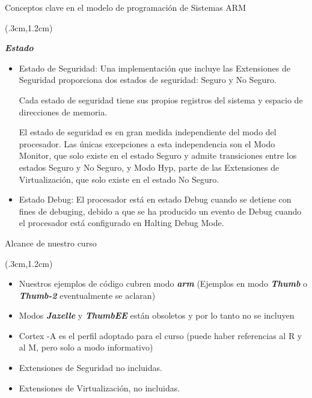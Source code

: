 \documentclass[usenames,table,dvipsnames,aspectratio=169]{beamer}
\newcommand{\arm}{\textbf{\textit{arm}}}
\newcommand{\Thumb}{\textbf{\textit{Thumb}}}
\newcommand{\Thdos}{\textbf{\textit{Thumb-2}}}
\newcommand{\jazz}{\textbf{\textit{Jazelle}}}
\newcommand{\tbee}{\textbf{\textit{ThumbEE}}}
\begin{document}
\begin{frame}{Conceptos clave en el modelo de programación de Sistemas ARM}
 \begin{textblock*}{\textwidth}(.3cm,1.2cm)
  \begin{tcolorbox}[enhanced,colframe=blue!70!black, colback=blue!4, drop fuzzy shadow=black!40, boxrule=0.8pt, boxsep=2mm, left=2mm, right=2mm, top=1mm, bottom=1mm, arc=2mm]
   \textbf{\textit{Estado}}
   \begin{itemize}
    \item Estado de Seguridad: Una implementación que incluye las Extensiones de Seguridad proporciona dos estados de seguridad: Seguro y No Seguro.

    Cada estado de seguridad tiene sus propios registros del sistema y espacio de direcciones de memoria.

    El estado de seguridad es en gran medida independiente del modo del procesador. Las únicas excepciones a esta independencia son el Modo Monitor, que solo existe en el estado Seguro y admite transiciones entre los estados Seguro y No Seguro, y Modo Hyp, parte de las Extensiones de Virtualización, que solo existe en el estado No Seguro.
    \item Estado Debug: El procesador está en estado Debug cuando se detiene con fines de debuging, debido a que se ha producido un evento de Debug cuando el procesador está configurado en Halting Debug Mode.
   \end{itemize}
  \end{tcolorbox}
  \end{textblock*}
\end{frame}

\begin{frame}{Alcance de nuestro curso}
   \begin{textblock*}{\textwidth}(.3cm,1.2cm)
    \begin{itemize}[<+(1)->]\justifying \parskip 0.15cm
     \item Nuestros ejemplos de código cubren modo \arm{} (Ejemplos en modo \Thumb{} o \Thdos{} eventualmente se aclaran)
     \item Modos \jazz{} y \tbee{} están obsoletos y por lo tanto no se incluyen
     \item Cortex -A es el perfil adoptado para el curso (puede haber referencias al R y al M, pero solo a modo informativo)
     \item Extensiones de Seguridad no incluidas.
     \item Extensiones de Virtualización, no incluidas.
    \end{itemize}
   \end{textblock*}
\end{frame}
\end{document}
